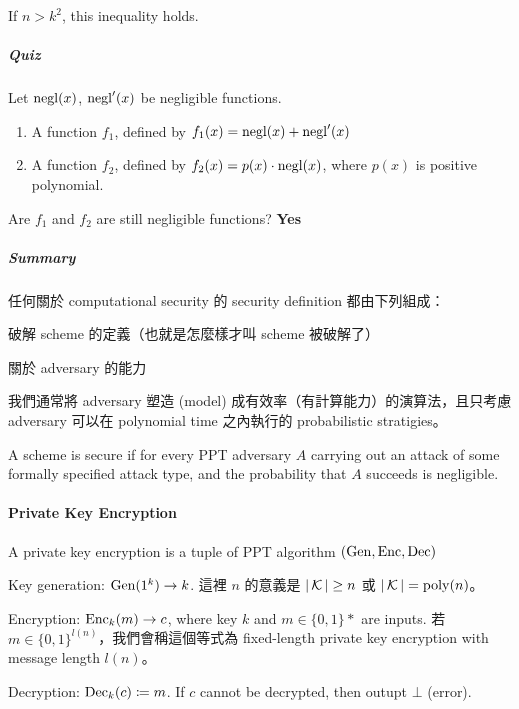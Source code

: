 If \(n > k^2\), this inequality holds.

\subparagraph{Quiz}

Let \(\operatorname{negl}(x)\), \(\operatorname{negl}'(x)\) be negligible functions. \\
\begin{enumerate}
	\item A function \(f_1\), defined by \(f_1(x) = \operatorname{negl}(x) + \operatorname{negl}'(x)\)
	\item A function \(f_2\), defined by \(f_2(x) = p(x) \cdot \operatorname{negl}(x)\), where \(p(x)\) is positive polynomial.
\end{enumerate}

Are \(f_1\) and \(f_2\) are still negligible functions? \textbf{Yes}

\subparagraph{Summary}

任何關於 computational security 的 security definition 都由下列組成：
\begin{myEnumerate}
	\item 破解 scheme 的定義（也就是怎麼樣才叫 scheme 被破解了）
	\item 關於 adversary 的能力
\end{myEnumerate}

我們通常將 adversary 塑造 (model) 成有效率（有計算能力）的演算法，且只考慮 adversary 可以在 polynomial time 之內執行的 probabilistic stratigies。

\begin{definition}
	A scheme is secure if for every PPT adversary \(A\) carrying out an attack of some formally specified attack type, and the probability that \(A\) succeeds is negligible.
\end{definition}


\paragraph{Private Key Encryption}

\begin{definition} \label{def:priv_key_enc}
	A private key encryption is a tuple of PPT algorithm \((\operatorname{Gen}, \operatorname{Enc}, \operatorname{Dec})\) \\
	\begin{myItemize}
		\item Key generation: \(\operatorname{Gen}(1^k) \rightarrow k\). 這裡 \(n\) 的意義是 \(|\operatorname{\mathcal{K}}| \geq n\) 或 \(|\operatorname{\mathcal{K}}| = \mathrm{poly}(n)\)。
		
		\item Encryption: \(\operatorname{Enc}_k(m) \rightarrow c\), where key \(k\) and \(m \in \{0, 1\}*\) are inputs. 若 \(m \in \{0, 1\}^{l(n)}\)，我們會稱這個等式為 fixed-length private key encryption with message length \(l(n)\)。
		
		\item Decryption: \(\operatorname{Dec}_k(c) \coloneq m\). If \(c\) cannot be decrypted, then outupt \(\bot\) (error). 
	\end{myItemize}
\end{definition}


